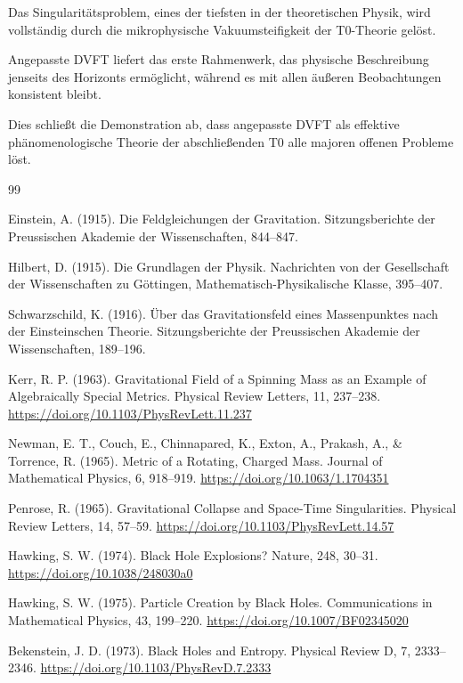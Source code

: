 	Das Singularitätsproblem, eines der tiefsten in der theoretischen Physik, wird vollständig durch die mikrophysische Vakuumsteifigkeit der T0-Theorie gelöst.
	
	Angepasste DVFT liefert das erste Rahmenwerk, das physische Beschreibung jenseits des Horizonts ermöglicht, während es mit allen äußeren Beobachtungen konsistent bleibt.
	
	Dies schließt die Demonstration ab, dass angepasste DVFT als effektive phänomenologische Theorie der abschließenden T0 alle majoren offenen Probleme löst.
	
	\begin{thebibliography}{99}
		
		Einstein, A. (1915). Die Feldgleichungen der Gravitation. Sitzungsberichte der Preussischen Akademie der Wissenschaften, 844–847.
		
		Hilbert, D. (1915). Die Grundlagen der Physik. Nachrichten von der Gesellschaft der Wissenschaften zu Göttingen, Mathematisch-Physikalische Klasse, 395–407.
		
		Schwarzschild, K. (1916). Über das Gravitationsfeld eines Massenpunktes nach der Einsteinschen Theorie. Sitzungsberichte der Preussischen Akademie der Wissenschaften, 189–196.
		
		Kerr, R. P. (1963). Gravitational Field of a Spinning Mass as an Example of Algebraically Special Metrics. Physical Review Letters, 11, 237–238. \url{https://doi.org/10.1103/PhysRevLett.11.237}
		
		Newman, E. T., Couch, E., Chinnapared, K., Exton, A., Prakash, A., \& Torrence, R. (1965). Metric of a Rotating, Charged Mass. Journal of Mathematical Physics, 6, 918–919. \url{https://doi.org/10.1063/1.1704351}
		
		Penrose, R. (1965). Gravitational Collapse and Space-Time Singularities. Physical Review Letters, 14, 57–59. \url{https://doi.org/10.1103/PhysRevLett.14.57}
		
		Hawking, S. W. (1974). Black Hole Explosions? Nature, 248, 30–31. \url{https://doi.org/10.1038/248030a0}
		
		Hawking, S. W. (1975). Particle Creation by Black Holes. Communications in Mathematical Physics, 43, 199–220. \url{https://doi.org/10.1007/BF02345020}
		
		Bekenstein, J. D. (1973). Black Holes and Entropy. Physical Review D, 7, 2333–2346. \url{https://doi.org/10.1103/PhysRevD.7.2333}
		

\end{thebibliography}
